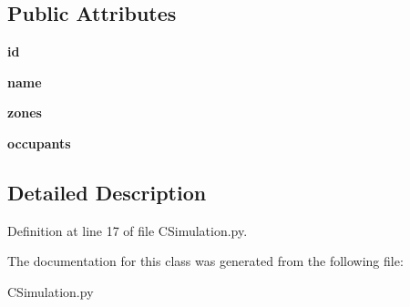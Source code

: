 \subsection*{Public Attributes}
\begin{DoxyCompactItemize}
\item 
\mbox{\label{class_c_simulation_1_1_simulation_1_1_building_acf2488b95c97e0378c9bf49de3b50f28}} 
{\bfseries id}
\item 
\mbox{\label{class_c_simulation_1_1_simulation_1_1_building_ab74e6bf80237ddc4109968cedc58c151}} 
{\bfseries name}
\item 
\mbox{\label{class_c_simulation_1_1_simulation_1_1_building_a5470eb43ca93def6f1c6c1241e08fb38}} 
{\bfseries zones}
\item 
\mbox{\label{class_c_simulation_1_1_simulation_1_1_building_a6bcc1aeccf6379863ed9aad40a45505c}} 
{\bfseries occupants}
\end{DoxyCompactItemize}


\subsection{Detailed Description}


Definition at line 17 of file C\+Simulation.\+py.



The documentation for this class was generated from the following file\+:\begin{DoxyCompactItemize}
\item 
C\+Simulation.\+py\end{DoxyCompactItemize}
